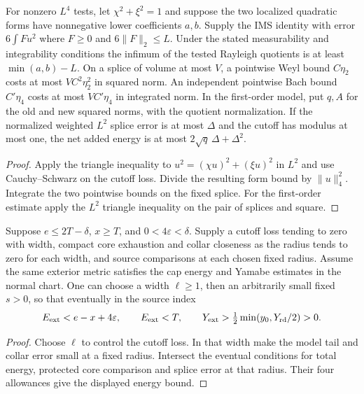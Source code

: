 \begin{lemma}
\label{lem:cut-cap-form}
\leanok
For nonzero $L^4$ tests, let $\chi^2+\xi^2=1$ and suppose the two
localized quadratic forms have nonnegative lower coefficients $a,b$.
Supply the IMS identity with error $6\int Fu^2$ where $F\ge0$ and
$6\|F\|_2\le L$. Under the stated measurability and integrability
conditions the infimum of the tested Rayleigh quotients is at least
$\min(a,b)-L$. On a splice of volume at most $V$, a pointwise Weyl
bound $C\eta_2$ costs at most $V C^2\eta_2^2$ in squared norm.
An independent pointwise Bach bound $C'\eta_4$ costs at most
$VC'\eta_4$ in integrated norm. In the first-order model, put
$q,A$ for the old and new squared norms, with the quotient normalization.
If the normalized weighted $L^2$ splice error is at most $\Delta$ and
the cutoff has modulus at most one, the net added energy is at most
$2\sqrt q\,\Delta+\Delta^2$.
\end{lemma}
\begin{proof}
\leanok
Apply the triangle inequality to $u^2=(\chi u)^2+(\xi u)^2$ in
$L^2$ and use Cauchy--Schwarz on the cutoff loss. Divide the resulting
form bound by $\|u\|_4^2$. Integrate the two pointwise bounds on the
fixed splice. For the first-order estimate apply the $L^2$ triangle
inequality on the pair of splices and square.
\end{proof}

\begin{lemma}
\label{lem:cut-ordered-selection}
\leanok
Suppose $e\le2T-\delta$, $x\ge T$, and $0<4\varepsilon<\delta$.
Supply a cutoff loss tending to zero with width, compact core exhaustion
and collar closeness as the radius tends to zero for each width, and
source comparisons at each chosen fixed radius. Assume the same exterior
metric satisfies the cap energy and Yamabe estimates in the normal chart.
One can choose a width $\ell\ge1$, then an arbitrarily small fixed
$s>0$, so that eventually in the source index
\[
 E_{\rm ext}<e-x+4\varepsilon,\qquad E_{\rm ext}<T,\qquad
 Y_{\rm ext}>\tfrac12\min(y_0,Y_{\rm rd}/2)>0.
\]
\end{lemma}
\begin{proof}
\leanok
Choose $\ell$ to control the cutoff loss. In that width make the model
tail and collar error small at a fixed radius. Intersect the eventual
conditions for total energy, protected core comparison and splice error
at that radius. Their four allowances give the displayed energy bound.
\end{proof}

